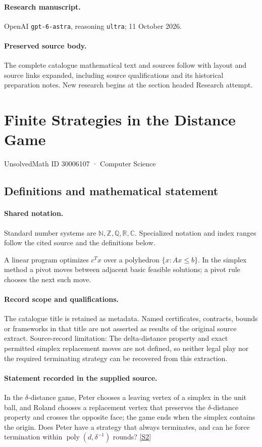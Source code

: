 \documentclass[11pt]{article}
\begin{document}
\paragraph{Research manuscript.} OpenAI \texttt{gpt-6-astra}, reasoning \texttt{ultra}; 11 October 2026.
\paragraph{Preserved source body.} The complete catalogue mathematical text and sources follow with layout and source links expanded, including source qualifications and its historical preparation notes. New research begins at the section headed Research attempt.

\section{Finite Strategies in the Distance Game}\label{30006107}
{\small UnsolvedMath ID 30006107 · Computer Science}
\subsection{Definitions and mathematical statement}

\paragraph{Shared notation.}Standard number systems are $\mathbb N,\mathbb Z,\mathbb Q,\mathbb R,\mathbb C$. Specialized notation and index ranges follow the cited source and the definitions below.


A linear program optimizes $c^Tx$ over a polyhedron $\{x:Ax\leq b\}$. In the simplex method a pivot moves between adjacent basic feasible solutions; a pivot rule chooses the next such move.
\paragraph{Record scope and qualifications.}
The catalogue title is retained as metadata. Named certificates, contracts, bounds or frameworks in that title are not asserted as results of the original source extract.
Source-record limitation: The delta-distance property and exact permitted simplex replacement moves are not defined, so neither legal play nor the required terminating strategy can be recovered from this extraction.
\paragraph{Statement recorded in the supplied source.}
In the $\delta$-distance game, Peter chooses a leaving vertex of a simplex in the unit ball, and Roland chooses a replacement vertex that preserves the $\delta$-distance property and crosses the opposite face; the game ends when the simplex contains the origin. Does Peter have a strategy that always terminates, and can he force termination within $\operatorname{poly}(d,\delta^{-1})$ rounds? \href{https://doi.org/10.4171/owr/2024/50}{[S2]}
\end{document}
